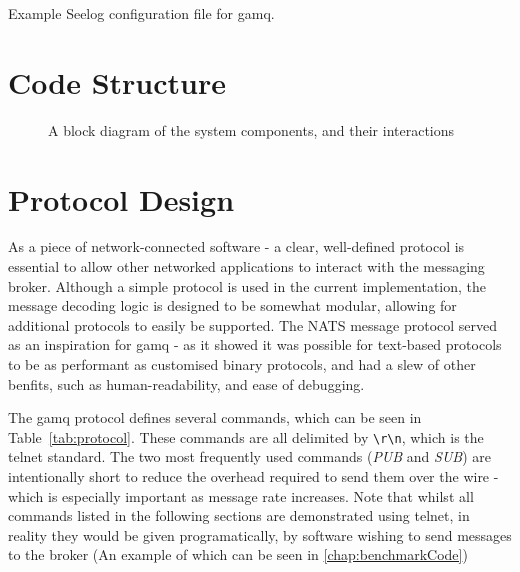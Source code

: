 \begin{listing}[ht]
  \centering
  \inputminted{xml}{code/gamq/config/logconfig.xml}
  \caption{Example Seelog configuration file for gamq.}
  \label{lst:seelogConfig}
\end{listing}

\section{Code Structure}
\label{sec:codestructure}

\begin{figure}[H]
  \centering
  
  \caption{A block diagram of the system components, and their interactions}
  \label{fig:systemBlockDiagram}
\end{figure}

\section{Protocol Design}
\label{sec:protocol}

As a piece of network-connected software - a clear, well-defined protocol is
essential to allow other networked applications to interact with the messaging
broker. Although a simple protocol is used in the current implementation, the
message decoding logic is designed to be somewhat modular, allowing for
additional protocols to easily be supported. The NATS message
protocol\cite{natsProtocol} served as an inspiration for gamq - as it showed it
was possible for text-based protocols to be as performant as customised binary
protocols, and had a slew of other benfits, such as human-readability, and ease
of debugging.

The gamq protocol defines several commands, which can be seen in
Table~\ref{tab:protocol}. These commands are all delimited by \verb|\r\n|, which
is the telnet standard. The two most frequently used commands (\emph{PUB} and
\emph{SUB}) are intentionally short to reduce the overhead required to send them
over the wire - which is especially important as message rate increases. Note
that whilst all commands listed in the following sections are demonstrated using
telnet, in reality they would be given programatically, by software wishing to
send messages to the broker (An example of which can be seen in
\ref{chap:benchmarkCode})


